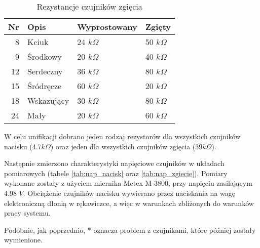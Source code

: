 \documentclass[10pt, a4paper]{article}
\begin{document}
\begin{table}[htbp]
  \centering
  \caption{Rezystancje czujników zgięcia}
    \begin{tabular}{rlll}
    \toprule
    \multicolumn{1}{l}{Nr} & Opis  & Wyprostowany & Zgięty \\
    \midrule
    8     & Kciuk & 24 $k\Omega$   & 50 $k\Omega$ \\
    9     & Środkowy & 20 $k\Omega$   & 40 $k\Omega$ \\
    12    & Serdeczny & 36 $k\Omega$   & 80 $k\Omega$ \\
    15    & Śródręcze & 60 $k\Omega$   & 20 $k\Omega$ \\
    18    & Wskazujący & 30 $k\Omega$   & 80 $k\Omega$ \\
    24    & Mały  & 20 $k\Omega$   & 60 $k\Omega$ \\
    \bottomrule
    \end{tabular}%
  \label{tab:rez_zgiecie}%
\end{table}%

W celu unifikacji dobrano jeden rodzaj rezystorów dla wszystkich czujników nacisku (4.7$k\Omega$) oraz jeden dla wszystkich czujników zgięcia (39$k\Omega$).

Następnie zmierzono charakterystyki napięciowe czujników w układach pomiarowych (tabele \ref{tab:nap_nacisk} oraz \ref{tab:nap_zgiecie}). Pomiary wykonane zostały z użyciem miernika Metex M-3800, przy napięciu zasilającym 4.98 $V$. Obciążenie czujników nacisku wywierano przez naciskania na wagę elektroniczną dłonią w rękawiczce, a więc w warunkach zbliżonych do warunków pracy systemu.

Podobnie, jak poprzednio, $*$ oznacza problem z czujnikami, które później zostały wymienione.
\end{document}
